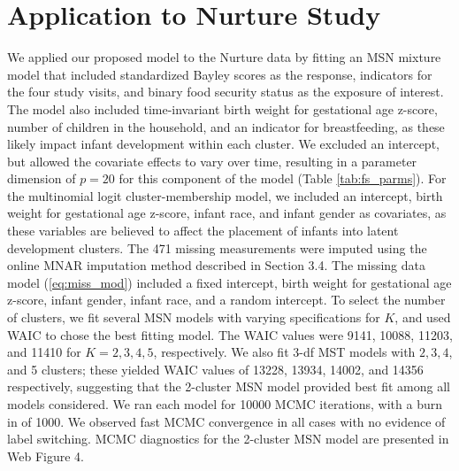 \documentclass[useAMS,usenatbib,referee]{biom}
\begin{document}
\section{Application to Nurture Study}
\label{s:app}
We applied our proposed model to the Nurture data by fitting an MSN mixture model that included standardized Bayley scores as the response, indicators for the four study visits, and binary food security status as the exposure of interest. The model also included time-invariant birth weight for gestational age z-score, number of children in the household, and an indicator for breastfeeding, as these likely impact infant development within each cluster. We excluded an intercept, but allowed the covariate effects to vary over time, resulting in a parameter dimension of $p=20$ for this component of the model (Table \ref{tab:fs_parms}). For the multinomial logit cluster-membership model, we included an intercept, birth weight for gestational age z-score, infant race, and infant gender as covariates, as these variables are believed to affect the placement of infants into latent development clusters. The 471 missing measurements were imputed using the online MNAR imputation method described in Section 3.4. The missing data model (\ref{eq:miss_mod}) included a fixed intercept, birth weight for gestational age z-score, infant gender, infant race, and a random intercept. To select the number of clusters, we fit several MSN models with varying specifications for $K$, and used WAIC to chose the best fitting model. The WAIC values were 9141, 10088, 11203, and 11410 for $K = 2,3,4,5$, respectively. We also fit 3-df MST models with $2, 3, 4$, and 5 clusters; these yielded WAIC values of 13228, 13934, 14002, and 14356 respectively, suggesting that the 2-cluster MSN model provided best fit among all models considered. We ran each model for 10000 MCMC iterations, with a burn in of 1000. We observed fast MCMC convergence in all cases with no evidence of label switching. MCMC diagnostics for the 2-cluster MSN model are presented in Web Figure 4.
\end{document}
